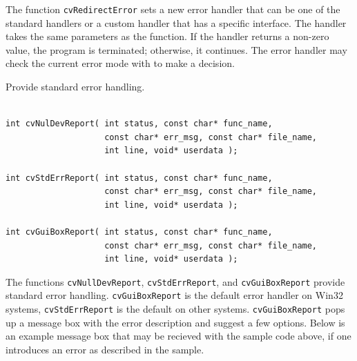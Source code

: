 \begin{description}
\end{description}

The function \texttt{cvRedirectError} sets a new error handler that
can be one of the standard handlers or a custom handler
that has a specific interface. The handler takes the same parameters
as the  function. If the handler returns a non-zero value, the
program is terminated; otherwise, it continues. The error handler may
check the current error mode with  to make a decision.


\label{cvNulDevReport}
\label{cvStdErrReport}
\label{cvGuiBoxReport}

Provide standard error handling.

\begin{lstlisting}

int cvNulDevReport( int status, const char* func_name,
                    const char* err_msg, const char* file_name,
                    int line, void* userdata );

int cvStdErrReport( int status, const char* func_name,
                    const char* err_msg, const char* file_name,
                    int line, void* userdata );

int cvGuiBoxReport( int status, const char* func_name,
                    const char* err_msg, const char* file_name,
                    int line, void* userdata );

\end{lstlisting}

\begin{description}
\end{description}

The functions \texttt{cvNullDevReport}, \texttt{cvStdErrReport},
and \texttt{cvGuiBoxReport} provide standard error
handling. \texttt{cvGuiBoxReport} is the default error
handler on Win32 systems, \texttt{cvStdErrReport} is the default on other
systems. \texttt{cvGuiBoxReport} pops up a message box with the error
description and suggest a few options. Below is an example message box
that may be recieved with the sample code above, if one introduces an
error as described in the sample.

